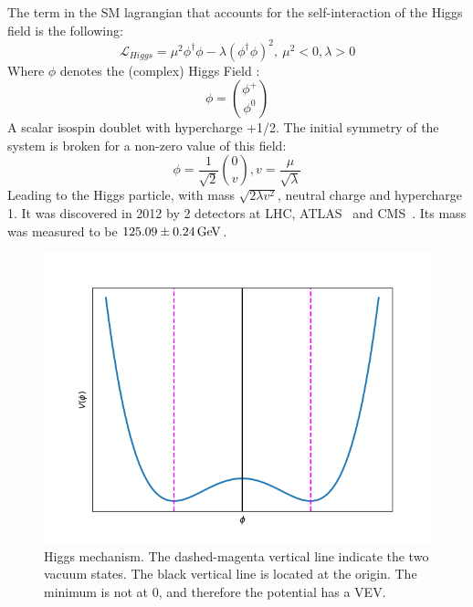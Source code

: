 The term in the SM lagrangian that accounts for the self-interaction of the Higgs field is the following:
\begin{equation}
\mathcal{L}_{Higgs} = \mu^2\phi^{\dagger} \phi - \lambda (\phi^{\dagger} \phi)^2, \ \mu^2 < 0, \lambda > 0
\end{equation}
Where $\phi$ denotes the (complex) Higgs Field :
\begin{equation}
\phi = \binom{\phi^+}{\phi^0}
\end{equation}
A scalar isospin doublet with hypercharge +1/2. The initial symmetry of the system is broken for a non-zero value of this field:
\begin{equation}
\phi = \frac{1}{\sqrt{2}}\binom{0}{v}, v = \frac{\mu}{\sqrt{\lambda}}
\end{equation}
Leading to the Higgs particle, with mass $\sqrt{2\lambda v^2}$, neutral charge and hypercharge 1. It was discovered in 2012 by 2 detectors at LHC, ATLAS~\cite{ATLASHiggs} and CMS~\cite{CMSHiggs}. Its mass was measured to be $125.09 \pm 0.24 \mathrm{\,Ge\kern -0.1em V}$.

\begin{figure} [htb!]
\begin{center}
\includegraphics[scale=0.7]{figs/higgs.png}
\caption{Higgs mechanism. The dashed-magenta vertical line indicate the two vacuum states. The black vertical line is located at the origin. The minimum is not at 0, and therefore the potential has a VEV. \label{fig:higgs}}
\end{center}
\end{figure}

